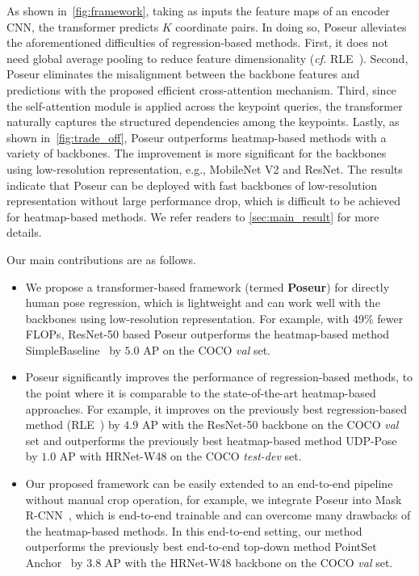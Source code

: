\documentclass[runningheads]{llncs}
\def\cf{\emph{cf.}\xspace}
\def\handle{{Poseur}\xspace}
\begin{document}
As shown in~\cref{fig:framework}, taking as inputs the feature maps of an encoder CNN, the transformer predicts $K$ coordinate pairs. In doing so, \handle alleviates the aforementioned difficulties of regression-based methods. First, it does not need global average pooling to reduce feature dimensionality (\cf RLE~\cite{li2021rle}). Second, \handle eliminates the misalignment between the backbone features and predictions with the proposed efficient cross-attention mechanism.
Third, since the self-attention module is applied across the keypoint queries, the transformer naturally captures the structured dependencies among the keypoints.
Lastly, as shown in~\cref{fig:trade_off}, \handle outperforms heatmap-based methods with a variety of backbones. The improvement is more significant for the backbones using low-resolution representation, e.g., MobileNet V2 and ResNet. The results indicate that \handle can be deployed with fast backbones of low-resolution representation without large performance drop, which is difficult to be achieved for heatmap-based methods. We refer readers to \cref{sec:main_result} for more details.






Our main contributions are as follows.
\begin{itemize}




\item  We propose a transformer-based framework (termed \textbf{\handle}) for directly human pose regression, which is lightweight and can work well with the backbones using low-resolution representation. For example, with 49\% fewer FLOPs, ResNet-50 based \handle outperforms the heatmap-based method SimpleBaseline~\cite{xiao2018simple} by $5.0$ AP on the COCO \emph{val} set.
\item \handle significantly improves the performance of regression-based methods, to the point where it is comparable to the state-of-the-art heatmap-based approaches. For example, it improves on the previously best regression-based method (RLE~\cite{li2021rle}) by $4.9$ AP with the ResNet-50 backbone on the COCO \emph{val} set and outperforms the previously best heatmap-based method UDP-Pose~\cite{sun2019deep} by $1.0$ AP with HRNet-W48 on the COCO \emph{test-dev} set.
\item Our proposed framework can be easily extended to an end-to-end pipeline without manual crop operation, for example, we integrate \handle into Mask R-CNN~\cite{he2017mask}, which is end-to-end trainable and can overcome many drawbacks of the heatmap-based methods. In this end-to-end setting, our method outperforms the previously best end-to-end top-down method PointSet Anchor~\cite{wei2020point} by $3.8$ AP with the HRNet-W48 backbone on the COCO \emph{val} set.




\end{itemize}
\end{document}
